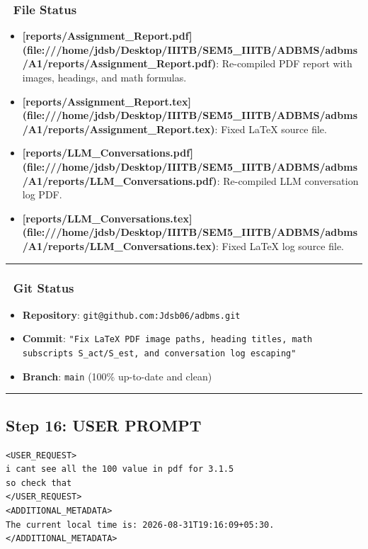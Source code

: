 \documentclass[11pt,a4paper]{article}
\begin{document}
{{{\subsubsection{📂 File Status}
\begin{itemize}
\item \textbf{[reports/Assignment\_Report.pdf](file:///home/jdsb/Desktop/IIITB/SEM5\_IIITB/ADBMS/adbms/A1/reports/Assignment\_Report.pdf)}: Re-compiled PDF report with images, headings, and math formulas.
\item \textbf{[reports/Assignment\_Report.tex](file:///home/jdsb/Desktop/IIITB/SEM5\_IIITB/ADBMS/adbms/A1/reports/Assignment\_Report.tex)}: Fixed LaTeX source file.
\item \textbf{[reports/LLM\_Conversations.pdf](file:///home/jdsb/Desktop/IIITB/SEM5\_IIITB/ADBMS/adbms/A1/reports/LLM\_Conversations.pdf)}: Re-compiled LLM conversation log PDF.
\item \textbf{[reports/LLM\_Conversations.tex](file:///home/jdsb/Desktop/IIITB/SEM5\_IIITB/ADBMS/adbms/A1/reports/LLM\_Conversations.tex)}: Fixed LaTeX log source file.
\end{itemize}

\hrule


\subsubsection{🐙 Git Status}
\begin{itemize}
\item \textbf{Repository}: \texttt{git@github.com:Jdsb06/adbms.git}
\item \textbf{Commit}: \texttt{"Fix LaTeX PDF image paths, heading titles, math subscripts S\_act/S\_est, and conversation log escaping"}
\item \textbf{Branch}: \texttt{main} (100\% up-to-date and clean)
\end{itemize}

\hrule

\subsection{Step 16: USER PROMPT}

\begin{lstlisting}[language=text]
<USER_REQUEST>
i cant see all the 100 value in pdf for 3.1.5
so check that 
</USER_REQUEST>
<ADDITIONAL_METADATA>
The current local time is: 2026-08-31T19:16:09+05:30.
</ADDITIONAL_METADATA>
\end{lstlisting}


}}}
\end{document}
